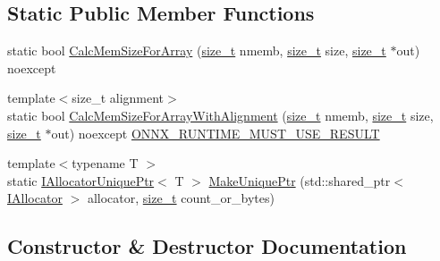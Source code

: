 \subsection*{Static Public Member Functions}
\begin{DoxyCompactItemize}
\item 
static bool \mbox{\hyperlink{classonnxruntime_1_1IAllocator_aea7bc9eca606c112261e38f32fe55fbe}{Calc\+Mem\+Size\+For\+Array}} (\mbox{\hyperlink{mlasi_8h_a503efbc1c6e50825320ad909366b78ab}{size\+\_\+t}} nmemb, \mbox{\hyperlink{mlasi_8h_a503efbc1c6e50825320ad909366b78ab}{size\+\_\+t}} size, \mbox{\hyperlink{mlasi_8h_a503efbc1c6e50825320ad909366b78ab}{size\+\_\+t}} $\ast$out) noexcept
\item 
{\footnotesize template$<$size\+\_\+t alignment$>$ }\\static bool \mbox{\hyperlink{classonnxruntime_1_1IAllocator_ae5059c340e3b8703dd8cea8bb52859d0}{Calc\+Mem\+Size\+For\+Array\+With\+Alignment}} (\mbox{\hyperlink{mlasi_8h_a503efbc1c6e50825320ad909366b78ab}{size\+\_\+t}} nmemb, \mbox{\hyperlink{mlasi_8h_a503efbc1c6e50825320ad909366b78ab}{size\+\_\+t}} size, \mbox{\hyperlink{mlasi_8h_a503efbc1c6e50825320ad909366b78ab}{size\+\_\+t}} $\ast$out) noexcept \mbox{\hyperlink{visibility__macros_8h_abad8122da950a248c3f5f420091584c7}{O\+N\+N\+X\+\_\+\+R\+U\+N\+T\+I\+M\+E\+\_\+\+M\+U\+S\+T\+\_\+\+U\+S\+E\+\_\+\+R\+E\+S\+U\+LT}}
\item 
{\footnotesize template$<$typename T $>$ }\\static \mbox{\hyperlink{namespaceonnxruntime_a323aace024f171700e4b07b299a178e7}{I\+Allocator\+Unique\+Ptr}}$<$ T $>$ \mbox{\hyperlink{classonnxruntime_1_1IAllocator_aeca9cc0ec6d93a4be93884e69380e893}{Make\+Unique\+Ptr}} (std\+::shared\+\_\+ptr$<$ \mbox{\hyperlink{classonnxruntime_1_1IAllocator}{I\+Allocator}} $>$ allocator, \mbox{\hyperlink{mlasi_8h_a503efbc1c6e50825320ad909366b78ab}{size\+\_\+t}} count\+\_\+or\+\_\+bytes)
\end{DoxyCompactItemize}


\subsection{Constructor \& Destructor Documentation}
\mbox{\label{classonnxruntime_1_1IAllocator_a0ba4d40b4b142731ff4511a2053bb72c}} 
